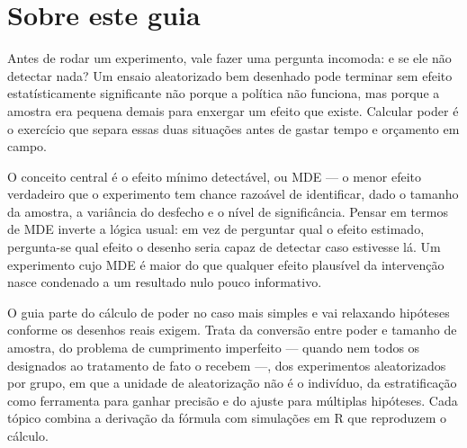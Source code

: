 \documentclass[12pt, a4paper, openany]{book}
\numberwithin{equation}{chapter}
\numberwithin{table}{chapter}
\numberwithin{figure}{chapter}
\begin{document}
\vfill


\newpage

\thispagestyle{empty}
\section*{Sobre este guia}
Antes de rodar um experimento, vale fazer uma pergunta incomoda: e se ele n\~ao
detectar nada? Um ensaio aleatorizado bem desenhado pode terminar sem efeito
estat\'isticamente significante n\~ao porque a pol\'itica n\~ao funciona, mas porque
a amostra era pequena demais para enxergar um efeito que existe. Calcular poder
\'e o exerc\'icio que separa essas duas situa\c{c}\~oes antes de gastar tempo e or\c{c}amento
em campo.

O conceito central \'e o efeito m\'inimo detect\'avel, ou MDE --- o menor efeito
verdadeiro que o experimento tem chance razo\'avel de identificar, dado o tamanho
da amostra, a vari\^ancia do desfecho e o n\'ivel de signific\^ancia. Pensar em
termos de MDE inverte a l\'ogica usual: em vez de perguntar qual o efeito
estimado, pergunta-se qual efeito o desenho seria capaz de detectar caso
estivesse l\'a. Um experimento cujo MDE \'e maior do que qualquer efeito
plaus\'ivel da interven\c{c}\~ao nasce condenado a um resultado nulo pouco informativo.

O guia parte do c\'alculo de poder no caso mais simples e vai relaxando hip\'oteses
conforme os desenhos reais exigem. Trata da convers\~ao entre poder e tamanho de
amostra, do problema de cumprimento imperfeito --- quando nem todos os designados
ao tratamento de fato o recebem ---, dos experimentos aleatorizados por grupo,
em que a unidade de aleatoriza\c{c}\~ao n\~ao \'e o indiv\'iduo, da estratifica\c{c}\~ao como
ferramenta para ganhar precis\~ao e do ajuste para m\'ultiplas hip\'oteses. Cada
t\'opico combina a deriva\c{c}\~ao da f\'ormula com simula\c{c}\~oes em R que reproduzem o
c\'alculo.
\end{document}
